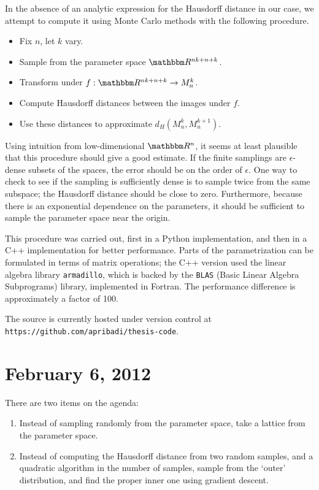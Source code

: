 \documentclass[12pt]{article}
\begin{document}
In the absence of an analytic expression for the Hausdorff distance in our case,
we attempt to compute it using Monte Carlo methods with the following procedure.
\begin{itemize}\nospace
    \item Fix $n$, let $k$ vary.
    \item Sample from the parameter space $\R^{nk + n + k}$.
    \item Transform under $f: \R^{nk + n + k} \to M_n^k$.
    \item Compute Hausdorff distances between the images under $f$.
    \item Use these distances to approximate $d_H(M_n^k, M_n^{k+1})$.
\end{itemize}
Using intuition from low-dimensional $\R^n$, it seems at least plausible that
this procedure should give a good estimate.  If the finite samplings are
$\epsilon$-dense subsets of the spaces, the error should be on the order of
$\epsilon$.  One way to check to see if the sampling is sufficiently dense is to
sample twice from the same subspace; the Hausdorff distance should be close to
zero.  Furthermore, because there is an exponential dependence on the
parameters, it should be sufficient to sample the parameter space near the
origin.

This procedure was carried out, first in a Python implementation, and then in a
C++ implementation for better performance.  Parts of the parametrization can be
formulated in terms of matrix operations; the C++ version used the linear
algebra library \texttt{armadillo}, which is backed by the \texttt{BLAS} (Basic
Linear Algebra Subprograms) library, implemented in Fortran.  The performance
difference is approximately a factor of 100.

The source is currently hosted under version control at
\mbox{\texttt{https://github.com/apribadi/thesis-code}}.

\section{February 6, 2012}

There are two items on the agenda:
\begin{enumerate}
    \item Instead of sampling randomly from the parameter space, take a lattice
    from the parameter space.
    \item Instead of computing the Hausdorff distance from two random samples,
    and a quadratic algorithm in the number of samples, sample from the `outer'
    distribution, and find the proper inner one using gradient descent.
\end{enumerate}
\end{document}
